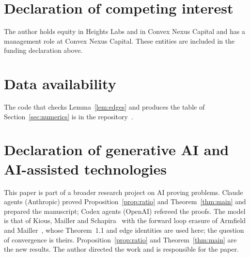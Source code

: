 \documentclass[11pt]{amsart}
\theoremstyle{remark}
\begin{document}
\section*{Declaration of competing interest}
The author holds equity in Heights Labs and in Convex Nexus Capital and has a management role at Convex Nexus Capital.
These entities are included in the funding declaration above.

\section*{Data availability}
The code that checks Lemma~\ref{lem:edges} and produces the table of Section~\ref{sec:numerics} is in the
repository~\cite{Repo}.

\section*{Declaration of generative AI and AI-assisted technologies}
This paper is part of a broader research project on AI proving problems. Claude agents (Anthropic) proved
Proposition~\ref{prop:ratio} and Theorem~\ref{thm:main} and prepared the manuscript; Codex agents (OpenAI) refereed the
proofs. The model is that of Kious, Mailler and Schapira~\cite{KMS22a} with the forward loop erasure of Armfield and
Mailler~\cite{AM}, whose Theorem~1.1 and edge identities are used here; the question of convergence is theirs.
Proposition~\ref{prop:ratio} and Theorem~\ref{thm:main} are the new results. The author directed the work and is
responsible for the paper.
\end{document}
